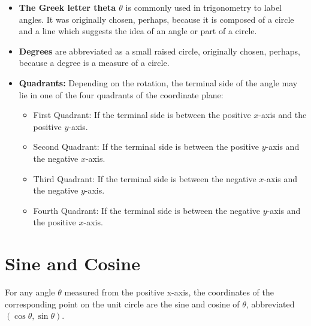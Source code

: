 \documentclass[12pt]{article}
\begin{document}
\begin{itemize}
\item \textbf{The Greek letter theta $\theta$} is commonly used in trigonometry to label angles. It was originally chosen, perhaps, because it is composed of a circle and a line which suggests the idea of an angle or part of a circle.
\item \textbf{Degrees} are abbreviated as a small raised circle, originally chosen, perhaps, because a degree is a measure of a circle.

\item  \textbf{Quadrants:} Depending on the rotation, the terminal side of the angle may lie in one of the four quadrants of the coordinate plane:
    \begin{itemize}
    \item First Quadrant: If the terminal side is between the positive \(x\)-axis and the positive \(y\)-axis.
    \item Second Quadrant: If the terminal side is between the positive \(y\)-axis and the negative \(x\)-axis.
    \item Third Quadrant: If the terminal side is between the negative \(x\)-axis and the negative \(y\)-axis.
    \item Fourth Quadrant: If the terminal side is between the negative \(y\)-axis and the positive \(x\)-axis.
\end{itemize}
\end{itemize}

\begin{center}
\end{center}

\newpage

\section*{Sine and Cosine}
For any angle \(\theta\) measured from the positive x-axis, the coordinates of the corresponding point on the unit circle are the sine and cosine of $\theta$, abbreviated \((\cos \theta, \sin \theta)\).\\
\end{document}
